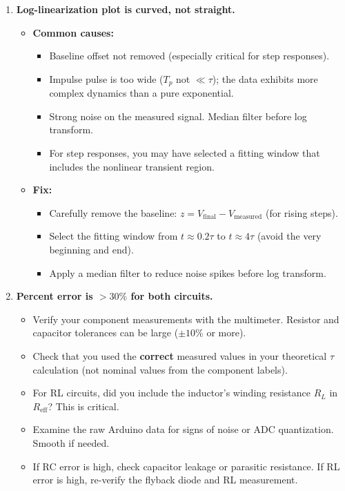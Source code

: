 \documentclass[11pt,letterpaper]{article}
\begin{document}
\begin{enumerate}
    \item \textbf{Log-linearization plot is curved, not straight.}
    \begin{itemize}
        \item \textbf{Common causes:}
        \begin{itemize}
            \item Baseline offset not removed (especially critical for step responses).
            \item Impulse pulse is too wide ($T_p$ not $\ll \tau$); the data exhibits more complex dynamics than a pure exponential.
            \item Strong noise on the measured signal. Median filter before log transform.
            \item For step responses, you may have selected a fitting window that includes the nonlinear transient region.
        \end{itemize}
        \item \textbf{Fix:}
        \begin{itemize}
            \item Carefully remove the baseline: $z = V_{\text{final}} - V_{\text{measured}}$ (for rising steps).
            \item Select the fitting window from $t \approx 0.2\tau$ to $t \approx 4\tau$ (avoid the very beginning and end).
            \item Apply a median filter to reduce noise spikes before log transform.
        \end{itemize}
    \end{itemize}

    \item \textbf{Percent error is $>30\%$ for both circuits.}
    \begin{itemize}
        \item Verify your component measurements with the multimeter. Resistor and capacitor tolerances can be large ($\pm 10\%$ or more).
        \item Check that you used the \textbf{correct} measured values in your theoretical $\tau$ calculation (not nominal values from the component labels).
        \item For RL circuits, did you include the inductor's winding resistance $R_L$ in $R_{\text{eff}}$? This is critical.
        \item Examine the raw Arduino data for signs of noise or ADC quantization. Smooth if needed.
        \item If RC error is high, check capacitor leakage or parasitic resistance. If RL error is high, re-verify the flyback diode and RL measurement.
    \end{itemize}


\end{enumerate}
\end{document}
